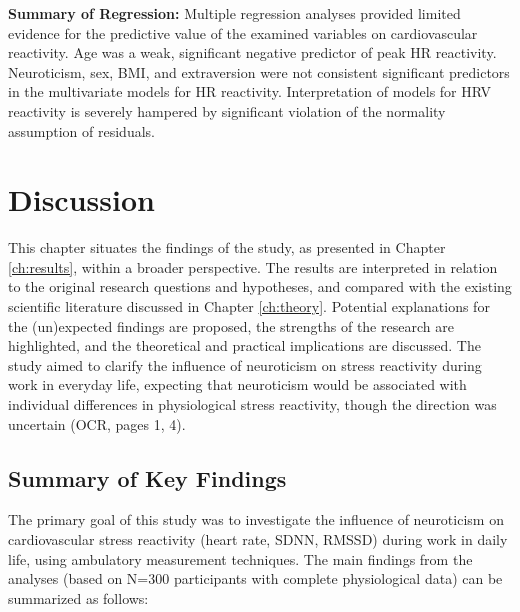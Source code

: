 \documentclass[11pt, a4paper]{report}
\begin{document}
\textbf{Summary of Regression:} Multiple regression analyses provided limited evidence for the predictive value of the examined variables on cardiovascular reactivity. Age was a weak, significant negative predictor of peak HR reactivity. Neuroticism, sex, BMI, and extraversion were not consistent significant predictors in the multivariate models for HR reactivity. Interpretation of models for HRV reactivity is severely hampered by significant violation of the normality assumption of residuals.

\chapter{Discussion}
\label{ch:discussion}

This chapter situates the findings of the study, as presented in Chapter \ref{ch:results}, within a broader perspective. The results are interpreted in relation to the original research questions and hypotheses, and compared with the existing scientific literature discussed in Chapter \ref{ch:theory}. Potential explanations for the (un)expected findings are proposed, the strengths of the research are highlighted, and the theoretical and practical implications are discussed. The study aimed to clarify the influence of neuroticism on stress reactivity during work in everyday life, expecting that neuroticism would be associated with individual differences in physiological stress reactivity, though the direction was uncertain \cite{ThesisTempPDF} (OCR, pages 1, 4).

\section{Summary of Key Findings}
\label{sec:discussion_summary}

The primary goal of this study was to investigate the influence of neuroticism on cardiovascular stress reactivity (heart rate, SDNN, RMSSD) during work in daily life, using ambulatory measurement techniques. The main findings from the analyses (based on N=300 participants with complete physiological data) can be summarized as follows:
\end{document}
